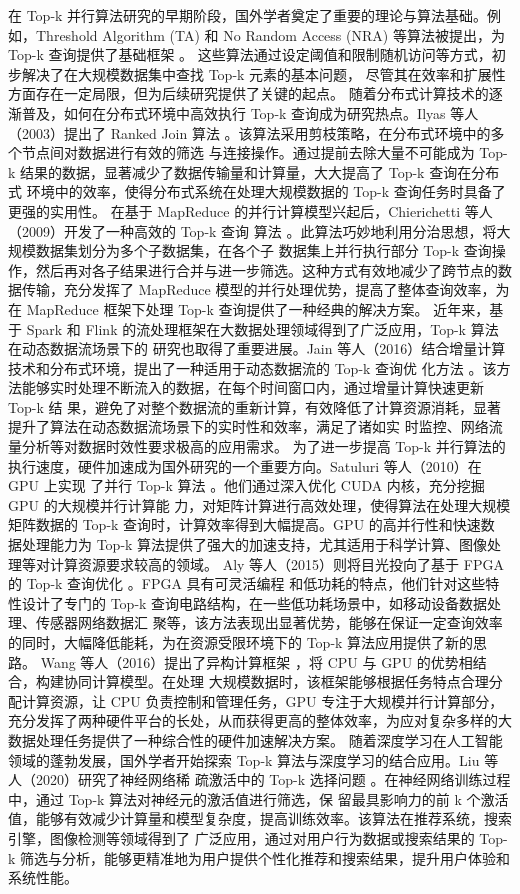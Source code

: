在 Top-k 并行算法研究的早期阶段，国外学者奠定了重要的理论与算法基础。例如，Threshold Algorithm (TA) 和 No Random Access 
(NRA) 等算法被提出，为 Top-k 查询提供了基础框架 \cite {fagin2001optimal}。
这些算法通过设定阈值和限制随机访问等方式，初步解决了在大规模数据集中查找 Top-k 元素的基本问题，
尽管其在效率和扩展性方面存在一定局限，但为后续研究提供了关键的起点。
随着分布式计算技术的逐渐普及，如何在分布式环境中高效执行 Top-k 查询成为研究热点。Ilyas 等人（2003）提出了
 Ranked Join 算法 \cite {ilyas2003}。该算法采用剪枝策略，在分布式环境中的多个节点间对数据进行有效的筛选
 与连接操作。通过提前去除大量不可能成为 Top-k 结果的数据，显著减少了数据传输量和计算量，大大提高了 Top-k 查询在分布式
 环境中的效率，使得分布式系统在处理大规模数据的 Top-k 查询任务时具备了更强的实用性。
在基于 MapReduce 的并行计算模型兴起后，Chierichetti 等人（2009）开发了一种高效的 Top-k 查询
算法 \cite {chierichetti2009}。此算法巧妙地利用分治思想，将大规模数据集划分为多个子数据集，在各个子
数据集上并行执行部分 Top-k 查询操作，然后再对各子结果进行合并与进一步筛选。这种方式有效地减少了跨节点的数据传输，充分发挥了 MapReduce 模型的并行处理优势，提高了整体查询效率，为在 MapReduce 框架下处理 Top-k 查询提供了一种经典的解决方案。
近年来，基于 Spark 和 Flink 的流处理框架在大数据处理领域得到了广泛应用，Top-k 算法在动态数据流场景下的
研究也取得了重要进展。Jain 等人（2016）结合增量计算技术和分布式环境，提出了一种适用于动态数据流的 Top-k 查询优
化方法 \cite {jain2016}。该方法能够实时处理不断流入的数据，在每个时间窗口内，通过增量计算快速更新 Top-k 结
果，避免了对整个数据流的重新计算，有效降低了计算资源消耗，显著提升了算法在动态数据流场景下的实时性和效率，满足了诸如实
时监控、网络流量分析等对数据时效性要求极高的应用需求。
为了进一步提高 Top-k 并行算法的执行速度，硬件加速成为国外研究的一个重要方向。Satuluri 等人（2010）在 GPU 上实现
了并行 Top-k 算法 \cite {satuluri2010}。他们通过深入优化 CUDA 内核，充分挖掘 GPU 的大规模并行计算能
力，对矩阵计算进行高效处理，使得算法在处理大规模矩阵数据的 Top-k 查询时，计算效率得到大幅提高。GPU 的高并行性和快速数
据处理能力为 Top-k 算法提供了强大的加速支持，尤其适用于科学计算、图像处理等对计算资源要求较高的领域。
Aly 等人（2015）则将目光投向了基于 FPGA 的 Top-k 查询优化 \cite {aly2015}。FPGA 具有可灵活编程
和低功耗的特点，他们针对这些特性设计了专门的 Top-k 查询电路结构，在一些低功耗场景中，如移动设备数据处理、传感器网络数据汇
聚等，该方法表现出显著优势，能够在保证一定查询效率的同时，大幅降低能耗，为在资源受限环境下的 Top-k 算法应用提供了新的思路。
Wang 等人（2016）提出了异构计算框架 \cite {wang2016}，将 CPU 与 GPU 的优势相结合，构建协同计算模型。在处理
大规模数据时，该框架能够根据任务特点合理分配计算资源，让 CPU 负责控制和管理任务，GPU 专注于大规模并行计算部分，充分发挥了两种硬件平台的长处，从而获得更高的整体效率，为应对复杂多样的大数据处理任务提供了一种综合性的硬件加速解决方案。
随着深度学习在人工智能领域的蓬勃发展，国外学者开始探索 Top-k 算法与深度学习的结合应用。Liu 等人（2020）研究了神经网络稀
疏激活中的 Top-k 选择问题 \cite {liu2020}。在神经网络训练过程中，通过 Top-k 算法对神经元的激活值进行筛选，保
留最具影响力的前 k 个激活值，能够有效减少计算量和模型复杂度，提高训练效率。该算法在推荐系统，搜索引擎，图像检测等领域得到了
广泛应用，通过对用户行为数据或搜索结果的 Top-k 筛选与分析，能够更精准地为用户提供个性化推荐和搜索结果，提升用户体验和系统性能\cite{girshick2015fast}。



